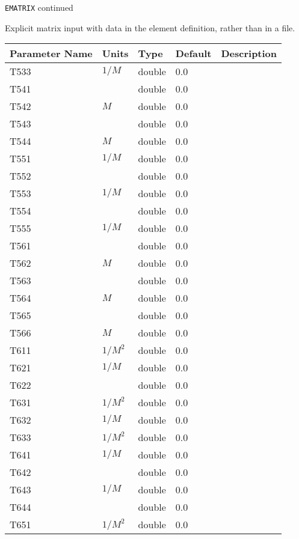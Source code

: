 \newpage
\begin{center}{\Large\verb|EMATRIX| continued}\end{center}
Explicit matrix input with data in the element definition, rather than in a file.
\\
\begin{tabular}{|l|l|l|l|p{\descwidth}|} \hline
Parameter Name & Units & Type & Default & Description \\ \hline 
T533 & $1/M$ & double &  0.0 & \\ \hline 
T541 &  & double &  0.0 & \\ \hline 
T542 & $M$ & double &  0.0 & \\ \hline 
T543 &  & double &  0.0 & \\ \hline 
T544 & $M$ & double &  0.0 & \\ \hline 
T551 & $1/M$ & double &  0.0 & \\ \hline 
T552 &  & double &  0.0 & \\ \hline 
T553 & $1/M$ & double &  0.0 & \\ \hline 
T554 &  & double &  0.0 & \\ \hline 
T555 & $1/M$ & double &  0.0 & \\ \hline 
T561 &  & double &  0.0 & \\ \hline 
T562 & $M$ & double &  0.0 & \\ \hline 
T563 &  & double &  0.0 & \\ \hline 
T564 & $M$ & double &  0.0 & \\ \hline 
T565 &  & double &  0.0 & \\ \hline 
T566 & $M$ & double &  0.0 & \\ \hline 
T611 & $1/M^2$ & double &  0.0 & \\ \hline 
T621 & $1/M$ & double &  0.0 & \\ \hline 
T622 &  & double &  0.0 & \\ \hline 
T631 & $1/M^2$ & double &  0.0 & \\ \hline 
T632 & $1/M$ & double &  0.0 & \\ \hline 
T633 & $1/M^2$ & double &  0.0 & \\ \hline 
T641 & $1/M$ & double &  0.0 & \\ \hline 
T642 &  & double &  0.0 & \\ \hline 
T643 & $1/M$ & double &  0.0 & \\ \hline 
T644 &  & double &  0.0 & \\ \hline 
T651 & $1/M^2$ & double &  0.0 & \\ \hline 

\end{tabular}
